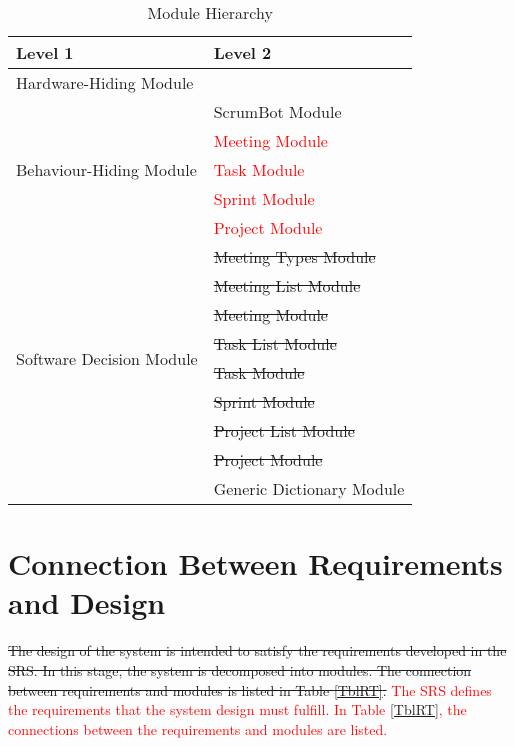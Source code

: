 \documentclass[12pt, titlepage]{article}
\begin{document}
\begin{table}[h!]
\centering
\begin{tabular}{p{} p{}}
\toprule
\textbf{Level 1} & \textbf{Level 2}\\
\midrule

{Hardware-Hiding Module} & ~ \\
\midrule

\multirow{5}{0.3\textwidth}{Behaviour-Hiding Module} 
& ScrumBot Module\\                             %
& \textcolor{red}{Meeting Module}\\             %
& \textcolor{red}{Task Module}\\                %
& \textcolor{red}{Sprint Module}\\              %
& \textcolor{red}{Project Module}\\             %
\midrule

\multirow{8}{0.3\textwidth}{Software Decision Module} 
& \sout{Meeting Types Module}\\         %
& \sout{Meeting List Module}\\          %
& \sout{Meeting Module}\\               %
& \sout{Task List Module}\\             %
& \sout{Task Module}\\                  %
& \sout{Sprint Module}\\                %
& \sout{Project List Module}\\          %
& \sout{Project Module}\\               %
& Generic Dictionary Module\\           %
\bottomrule

\end{tabular}
\caption{Module Hierarchy}
\label{TblMH}
\end{table}

\section{Connection Between Requirements and Design} \label{SecConnection}

\sout{The design of the system is intended to satisfy the requirements developed in the SRS. In this stage, the system is decomposed into modules. The connection between requirements and modules is listed in Table \ref{TblRT}.}
\textcolor{red}{The SRS defines the requirements that the system design must fulfill. In Table \ref{TblRT}, the connections between the requirements and modules are listed.}
\end{document}
